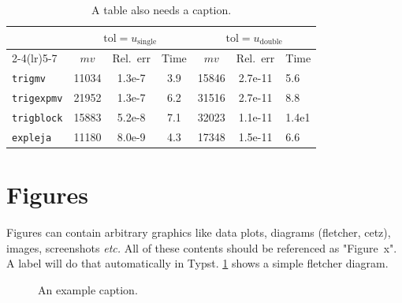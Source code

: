 \documentclass[sigconf,nonacm,screen]{acmart}
\begin{document}
\begin{table}[t]
  \centering
  \caption{A table also needs a caption. }
  \label{tab:my-table}
  \begin{tabular}{lcccccl}\toprule
    & \multicolumn{3}{c}{$\text{tol}=u_{\text{single}}$} & \multicolumn{3}{c}{$\text{tol}=u_{\text{double}}$}
    \\\cmidrule(lr){2-4}\cmidrule(lr){5-7}
    & $mv$  & Rel.~err & Time    & $mv$  & Rel.~err & Time\\\midrule
    \texttt{trigmv}    & 11034 & 1.3e-7 & 3.9 & 15846 & 2.7e-11 & 5.6 \\
    \texttt{trigexpmv} & 21952 & 1.3e-7 & 6.2 & 31516 & 2.7e-11 & 8.8 \\
    \texttt{trigblock} & 15883 & 5.2e-8 & 7.1 & 32023 & 1.1e-11 & 1.4e1\\
    \texttt{expleja}   & 11180 & 8.0e-9 & 4.3 & 17348 & 1.5e-11 & 6.6 \\\bottomrule
  \end{tabular}
\end{table}


\section{Figures}
Figures can contain arbitrary graphics like data plots, diagrams (fletcher, cetz), images, screenshots \textit{etc.} All of these contents should be referenced as "Figure~x". A label will do that automatically in Typst. \cref{fig:enter-label} shows a simple fletcher diagram.


\begin{figure}[b]
    \centering
{}
    \caption{An example caption.}
    \label{fig:enter-label}
\end{figure}
\end{document}
